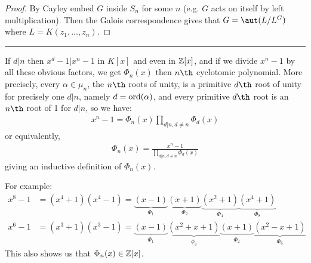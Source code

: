 \documentclass[a4paper, 10pt, twocolumn]{amsart}
\begin{document}
\begin{proof}
By Cayley embed $G$ inside $S_n$ for some $n$ (e.g. $G$ acts on itself by left multiplication). Then the Galois correspondence gives that $G = \aut (L/L^G)$ where $L = K(z_1, \ldots, z_n)$.
\end{proof}
\hrule
If $d|n$ then $x^d-1 | x^n-1$ in $K[x]$ and even in $\mathbb{Z}[x]$, and if we divide $x^n-1$ by all these obvious factors, we get $\Phi_n(x)$ then $n\th$ cyclotomic polynomial. More precisely, every $\alpha \in \mu_n$, the $n\th$ roots of unity, is a primitive $d\th$ root of unity for precisely one $d|n$, namely $d = \operatorname{ord}(\alpha)$, and every primitive $d\th$ root is an $n\th$ root of 1 for $d|n$, so we have:
\begin{align*}
x^n-1 = \Phi_n(x) \prod_{d|n, d\neq n} \Phi_d(x)
\end{align*}
or equivalently,
\begin{align*}
\Phi_n(x) = \frac{x^n-1}{\prod_{d|n, d\neq n}\Phi_d(x)}
\end{align*}
giving an inductive definition of $\Phi_n(x)$.

For example:
\begin{align*}
x^8-1 &= (x^4+1)(x^4-1) = \underbrace{(x-1)}_{\Phi_1}\underbrace{(x+1)}_{\Phi_2}\underbrace{(x^2+1)}_{\Phi_4}\underbrace{(x^4+1)}_{\Phi_8}\\
x^6-1 &= (x^3+1)(x^3-1) = \underbrace{(x-1)}_{\Phi_1}\underbrace{(x^2+x+1)}_{\phi_3}\underbrace{(x+1)}_{\Phi_2}\underbrace{(x^2-x+1)}_{\Phi_6}
\end{align*}
This also shows us that $\Phi_n(x) \in \mathbb{Z}[x]$.
\end{document}
